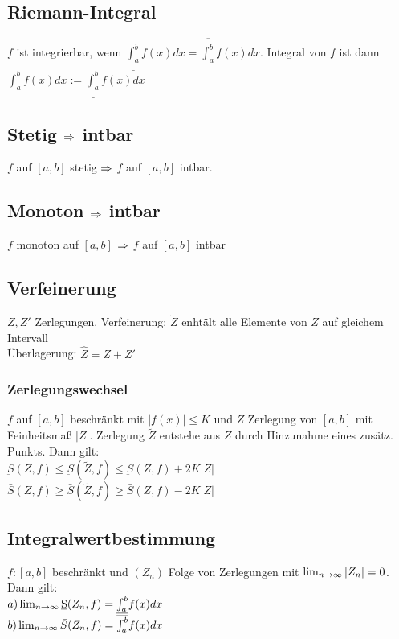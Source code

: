 \subsection*{Riemann-Integral}
$f$ ist integrierbar, wenn $\underline{\int_{a}^b} f(x) dx = \overline{\int_a^b} f(x) dx$. Integral von $f$ ist dann $\int_a^b f(x) dx := \underline{\int_a^b} f(x) dx$
\subsection*{Stetig \texorpdfstring{$\Rightarrow$}{folgt} intbar}
$f$ auf $[a, b]$ stetig $\Rightarrow$ $f$ auf $[a, b]$ intbar.
\subsection*{Monoton \texorpdfstring{$\Rightarrow$}{folgt} intbar}
$f$ monoton auf $[a, b]$ $\Rightarrow$ $f$ auf $[a, b]$ intbar
\subsection*{Verfeinerung}
$Z, Z'$ Zerlegungen.
Verfeinerung: $\tilde Z$ enhtält alle Elemente von $Z$ auf gleichem Intervall\\
Überlagerung: $\hat Z = Z + Z'$
\subsubsection*{Zerlegungswechsel}
$f$ auf $[a, b]$ beschränkt mit $|f(x)| \leq K$ und $Z$ Zerlegung von $[a, b]$ mit Feinheitsmaß $|Z|$. Zerlegung $\tilde Z$ entstehe aus $Z$ durch Hinzunahme eines zusätz. Punkts. Dann gilt:\\
    $\underbar S(Z, f) \leq \underbar S(\tilde Z, f) \leq \underbar S(Z, f) + 2K |Z|$\\
    $\bar S(Z, f) \geq \bar S(\tilde Z, f) \geq \bar S(Z, f) - 2K |Z|$
\subsection*{Integralwertbestimmung}
$f:[a, b]$ beschränkt und $(Z_n)$ Folge von Zerlegungen mit $\lim_{n \rightarrow \infty} |Z_n| = 0$. Dann gilt:\\
    $a) \lim_{n \rightarrow \infty} \underbar S(Z_n, f) = \underline{ \int_a^b} f(x) dx$\\
    $b) \lim_{n \rightarrow \infty} \bar S(Z_n, f) = \overline{\int_a^b} f(x) dx$
